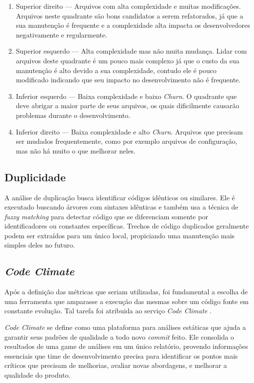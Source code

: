 \begin{enumerate}
    \item Superior direito — Arquivos com alta complexidade e muitas modificações. Arquivos neste quadrante são bons candidatos a serem refatorados, já que a sua manutenção é frequente e a complexidade alta impacta os desenvolvedores negativamente e regularmente. 
    \item Superior esquerdo — Alta complexidade mas não muita mudança. Lidar com arquivos deste quadrante é um pouco mais complexo já que o custo da sua manutenção é alto devido a sua complexidade, contudo ele é pouco modificado indicando que seu impacto no desenvolvimento não é frequente.
    \item Inferior esquerdo — Baixa complexidade e baixo \textit{Churn}. O quadrante que deve abrigar a maior parte de seus arquivos, os quais dificilmente causarão problemas durante o desenvolvimento.
    \item Inferior direito — Baixa complexidade e alto \textit{Churn}. Arquivos que precisam ser mudados frequentemente, como por exemplo arquivos de configuração, mas não há muito o que melhorar neles.
\end{enumerate}

\subsection{Duplicidade}

A análise de duplicação busca identificar códigos idênticos ou similares. Ele é executado buscando árvores com sintaxes idênticas e também usa a técnica de \textit{fuzzy matching} para detectar código que se diferenciam somente por identificadores ou constantes específicas. Trechos de código duplicados geralmente podem ser extraídos para um único local, propiciando uma manutenção mais simples deles no futuro.

\subsection{\textit{Code Climate}}

Após a definição das métricas que seriam utilizadas, foi fundamental a escolha de uma ferramenta que amparasse a execução das mesmas sobre um código fonte em constante evolução. Tal tarefa foi atribuida ao serviço \textit{Code Climate} \cite{website:codeclimate}. 

\textit{Code Climate} se define como uma plataforma para análises estáticas que ajuda a garantir seus padrões de qualidade a todo novo \textit{commit} feito. Ele consolida o resultados de uma game de análises em um único relatório, provendo informações essenciais que time de desenvolvimento precisa para identificar os pontos mais críticos que precisam de melhorias, avaliar novas abordagens, e melhorar a qualidade do produto.

